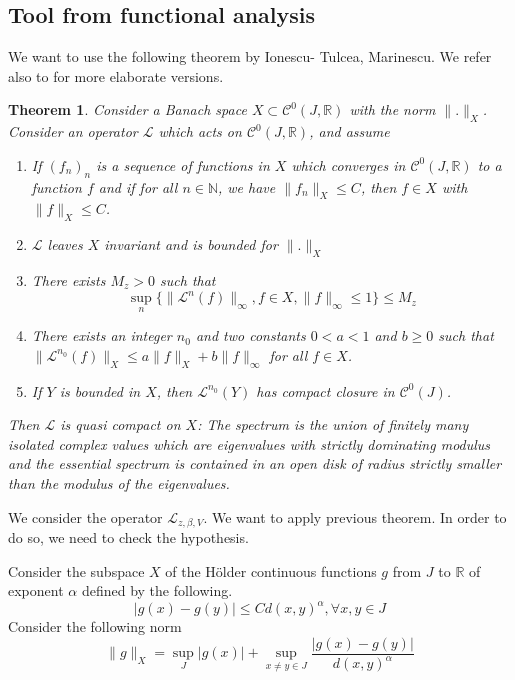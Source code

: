 \documentclass[11 pt]{article}
\newtheorem{theorem}[proposition]{Theorem}
\theoremstyle{definition}
\begin{document}
\subsection{Tool from functional analysis}

 We want to use the following theorem by Ionescu- Tulcea, Marinescu. We refer also to  \cite{Hennion-Herve} for more elaborate versions.
 
 
 
\begin{theorem}\cite{Ionescu-Marinescu}\label{ionescu}
Consider a Banach space $X\subset \mathcal C^0(J,\mathbb R)$ with the norm $\|.\|_X$. Consider an operator $\mathcal L$ which acts on $\mathcal C^0(J,\mathbb R)$, and assume
\begin{enumerate}
\item If $(f_n)_n$ is a sequence of functions in $X$ which converges in $\mathcal C^0(J,\mathbb R)$ to a function $f$ and if for all $n\in\mathbb N$, we have 
$\|f_n\|_X\leq C$, then $f\in X$ with $\|f\|_X\leq C$.
\item $\mathcal L$ leaves $X$ invariant and is bounded for $\|.\|_X$
\item There exists $M_z>0$ such that $$\sup_n\{\|\mathcal L^n(f)\|_\infty, f\in X, \|f\|_\infty\leq 1 \}\leq M_z$$
\item There exists an integer $n_0$ and two constants $0<a<1$ and $b\geq 0$ such that $\|\mathcal L^{n_0}(f)\|_X\leq a\|f\|_X+b\|f\|_\infty$ for all $f\in X$.
 \item If $Y$ is bounded in $X$, then $\mathcal L^{n_0}(Y)$ has compact closure in $\mathcal C^0(J)$.
\end{enumerate}
Then $\mathcal L$ is quasi compact on $X$: The spectrum is the union of finitely many isolated complex values which are eigenvalues with strictly dominating modulus and the essential spectrum is contained in an open disk of radius strictly smaller than the modulus of the eigenvalues.


\end{theorem}

We consider the operator $\mathcal L_{z,\beta, V}$. We want to apply previous theorem. In order to do so, we need to check the hypothesis.


Consider the subspace $X$ of the Hölder continuous functions $g$ from $J$ to $\mathbb R$ of exponent $\alpha$ defined by the following. 
$$|g(x)-g(y)|\leq Cd(x,y)^\alpha, \forall x,y\in J$$
Consider the following norm
$$\|g\|_X=\sup_J |g(x)|+\sup_{x\neq y\in J} \frac{|g(x)-g(y)|}{d(x,y)^{\alpha}}$$
\end{document}
